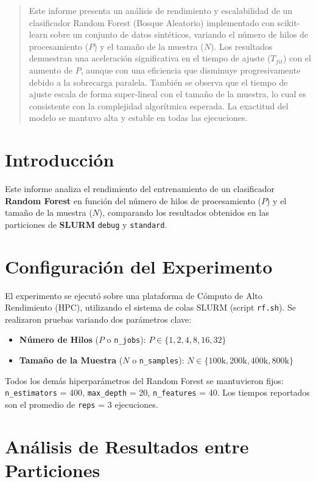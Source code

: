 \documentclass{article}
\begin{document}
\begin{abstract}
Este informe presenta un análisis de rendimiento y escalabilidad de un clasificador Random Forest
(Bosque Aleatorio) implementado con scikit-learn sobre un conjunto de datos sintéticos, variando el
número de hilos de procesamiento ($P$) y el tamaño de la muestra ($N$). Los resultados demuestran una
aceleración significativa en el tiempo de ajuste ($T_{fit}$) con el aumento de $P$, aunque con una eficiencia
que disminuye progresivamente debido a la sobrecarga paralela. También se observa que el tiempo de
ajuste escala de forma super-lineal con el tamaño de la muestra, lo cual es consistente con la complejidad
algorítmica esperada. La exactitud del modelo se mantuvo alta y estable en todas las ejecuciones.
\end{abstract}

\section{Introducción}
Este informe analiza el rendimiento del entrenamiento de un clasificador \textbf{Random Forest} en función del número de hilos de procesamiento ($P$) y el tamaño de la muestra ($N$), comparando los resultados obtenidos en las particiones de \textbf{SLURM} \texttt{debug} y \texttt{standard}.

\section{Configuración del Experimento}
El experimento se ejecutó sobre una plataforma de Cómputo de Alto Rendimiento (HPC), utilizando el
sistema de colas SLURM (script \texttt{rf.sh}). Se realizaron pruebas variando dos parámetros clave:

\begin{itemize}
    \item \textbf{Número de Hilos} ($P$ o \texttt{n\_jobs}): $P \in \{1, 2, 4, 8, 16, 32\}$
    \item \textbf{Tamaño de la Muestra} ($N$ o \texttt{n\_samples}): $N \in \{100\text{k}, 200\text{k}, 400\text{k}, 800\text{k}\}$
\end{itemize}

Todos los demás hiperparámetros del Random Forest se mantuvieron fijos: \texttt{n\_estimators} = 400, \texttt{max\_depth}
= 20, \texttt{n\_features} = 40. Los tiempos reportados son el promedio de \texttt{reps} = 3 ejecuciones.

\section{Análisis de Resultados entre Particiones}
\end{document}
